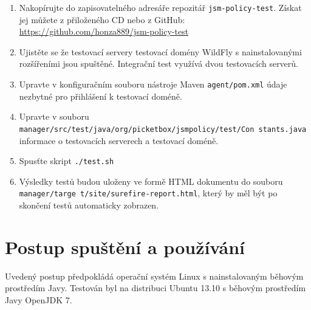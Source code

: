 \begin{enumerate}
  \item Nakopírujte do zapisovatelného adresáře repozitář {\tt jsm-policy-test}. Získat jej můžete z přiloženého CD nebo z GitHub:
    \newline\url{https://github.com/honza889/jsm-policy-test}
  \item Ujistěte se že testovací servery testovací domény WildFly s nainstalovanými rozšířeními jsou spuštěné. Integrační test využívá dvou testovacích serverů.
  \item Upravte v konfiguračním souboru nástroje Maven {\tt agent/pom.xml} údaje nezbytné pro přihlášení k testovací doméně.
  \item Upravte v souboru {\tt manager/src/test/java/org/picketbox/jsmpolicy/test/Con stants.java} informace o testovacích serverech a testovací doméně.
  \item Spusťte skript {\tt ./test.sh}
  \item Výsledky testů budou uloženy ve formě HTML dokumentu do souboru {\tt manager/targe t/site/surefire-report.html}, který by měl být po skončení testů automaticky zobrazen.
\end{enumerate}


\chapter{Postup spuštění a používání}\label{prilohaPouzivani}

Uvedený postup předpokládá operační systém Linux s nainstalovaným běhovým prostředím Javy. Testován byl na distribuci Ubuntu 13.10 s běhovým prostředím Javy OpenJDK 7.

